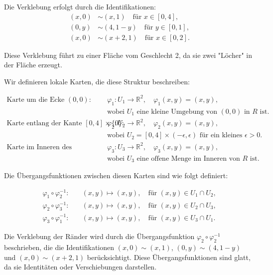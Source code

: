 \documentclass[11pt,a4paper]{article}
\begin{document}
Die Verklebung erfolgt durch die Identifikationen:
\begin{align*}
(x, 0) &\sim (x, 1) \quad \text{für } x \in [0, 4], \\
(0, y) &\sim (4, 1-y) \quad \text{für } y \in [0, 1], \\
(x, 0) &\sim (x+2, 1) \quad \text{für } x \in [0, 2].
\end{align*}

Diese Verklebung führt zu einer Fläche vom Geschlecht 2, da sie zwei "Löcher" in der Fläche erzeugt.

Wir definieren lokale Karten, die diese Struktur beschreiben:

\begin{align*}
\text{Karte um die Ecke } (0,0): \quad & \varphi_1: U_1 \to \mathbb{R}^2, \quad \varphi_1(x,y) = (x,y), \\
& \text{wobei } U_1 \text{ eine kleine Umgebung von } (0,0) \text{ in } R \text{ ist.} \\
\text{Karte entlang der Kante } [0,4] \times \{0\}: \quad & \varphi_2: U_2 \to \mathbb{R}^2, \quad \varphi_2(x,y) = (x,y), \\
& \text{wobei } U_2 = [0,4] \times (-\epsilon, \epsilon) \text{ für ein kleines } \epsilon > 0. \\
\text{Karte im Inneren des Rechtecks:} \quad & \varphi_3: U_3 \to \mathbb{R}^2, \quad \varphi_3(x,y) = (x,y), \\
& \text{wobei } U_3 \text{ eine offene Menge im Inneren von } R \text{ ist.}
\end{align*}

Die Übergangsfunktionen zwischen diesen Karten sind wie folgt definiert:

\begin{align*}
\varphi_1 \circ \varphi_2^{-1}: \quad & (x,y) \mapsto (x,y), \quad \text{für } (x,y) \in U_1 \cap U_2, \\
\varphi_2 \circ \varphi_3^{-1}: \quad & (x,y) \mapsto (x,y), \quad \text{für } (x,y) \in U_2 \cap U_3, \\
\varphi_3 \circ \varphi_1^{-1}: \quad & (x,y) \mapsto (x,y), \quad \text{für } (x,y) \in U_3 \cap U_1.
\end{align*}

Die Verklebung der Ränder wird durch die Übergangsfunktion $\varphi_2 \circ \varphi_2^{-1}$ beschrieben, die die Identifikationen $(x, 0) \sim (x, 1)$, $(0, y) \sim (4, 1-y)$ und $(x, 0) \sim (x+2, 1)$ berücksichtigt. Diese Übergangsfunktionen sind glatt, da sie Identitäten oder Verschiebungen darstellen.

\end{document}
